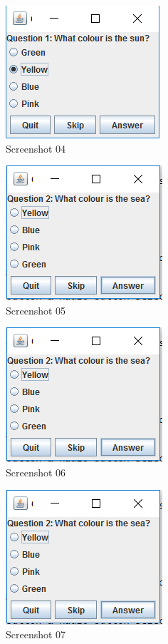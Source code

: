 \documentclass{report}
\begin{document}
    \begin{figure}
        \centering
        \includegraphics{Screenshot04}
        \caption{Screenshot 04}
        \label{fig:screenshot04}
    \end{figure}

    \begin{figure}
        \centering
        \includegraphics{Screenshot05}
        \caption{Screenshot 05}
        \label{fig:screenshot05}
    \end{figure}
    
    \begin{figure}
        \centering
        \includegraphics{Screenshot06}
        \caption{Screenshot 06}
        \label{fig:screenshot06}
    \end{figure}
    
    \begin{figure}
        \centering
        \includegraphics{Screenshot06}
        \caption{Screenshot 07}
        \label{fig:screenshot07}
    \end{figure}
    
\end{document}
